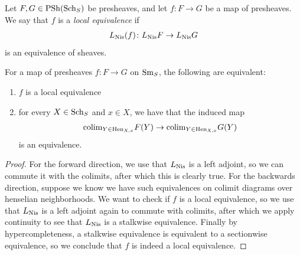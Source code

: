 \documentclass[11pt,openany]{book}
\renewcommand{\Pre}{\mathrm{PSh}}
\providecommand{\Hen}{\mathrm{Hen}}
\begin{document}
\begin{definition}\label{def:local-equivalence}
 Let $F,G\in \Pre(\Sch_S)$ be presheaves, and let $f \colon F \to G$ be a map of presheaves. We say that $f$ is a \textit{local equivalence} if
\begin{align*}
    L_{\mathrm{Nis}} (f) \colon L_{\mathrm{Nis}} F \to L_{\mathrm{Nis}} G
\end{align*}
is an equivalence of sheaves.
\end{definition}

\begin{proposition}\label{prop:stalkwise-iff-local-equivalence} For a map of presheaves $f \colon F \to G$ on $\mathrm{Sm}_S$, the following are equivalent:
\begin{enumerate}
    \item $f$ is a local equivalence
    \item for every $X\in \mathrm{Sch}_S$ and $x\in X$, we have that the induced map
    \begin{align*}
        \colim_{Y\in \Hen_{X,x}} F(Y) \to \colim_{Y\in \Hen_{X,x}} G(Y)
    \end{align*}
    is an equivalence.
\end{enumerate}
\end{proposition}
\begin{proof} For the forward direction, we use that $L_{\mathrm{Nis}}$ is a left adjoint, so we can commute it with the colimits, after which this is clearly true. For the backwards direction, suppose we know we have such equivalences on colimit diagrams over henselian neighborhoods. We want to check if $f$ is a local equivalence, so we use that $L_{\mathrm{Nis}}$ is a left adjoint again to commute with colimits, after which we apply continuity to see that $L_{\mathrm{Nis}}$ is a stalkwise equivalence. Finally by hypercompleteness, a stalkwise equivalence is equivalent to a sectionwise equivalence, so we conclude that $f$ is indeed a local equivalence.
\end{proof}


\end{document}
